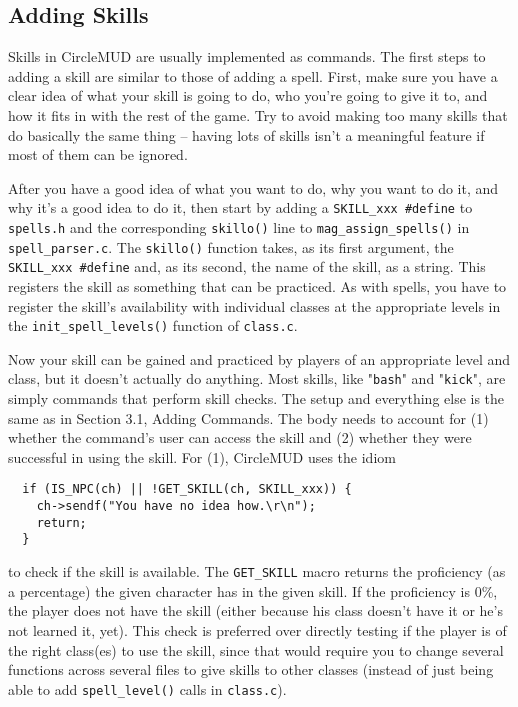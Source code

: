 \documentclass[11pt]{article}
\begin{document}
\subsection{Adding Skills}
Skills in CircleMUD are usually implemented as commands.  The first steps to adding a skill are similar to those of adding a spell.  First, make sure you have a clear idea of what your skill is going to do, who you're going to give it to, and how it fits in with the rest of the game.  Try to avoid making too many skills that do basically the same thing -- having lots of skills isn't a meaningful feature if most of them can be ignored.
\par
After you have a good idea of what you want to do, why you want to do it, and why it's a good idea to do it, then start by adding a \texttt{SKILL\_xxx \#define} to \texttt{spells.h} and the corresponding \texttt{skillo()} line to \texttt{mag\_assign\_spells()} in \texttt{spell\_parser.c}.  The \texttt{skillo()} function takes, as its first argument, the \texttt{SKILL\_xxx \#define} and, as its second, the name of the skill, as a string.  This registers the skill as something that can be practiced.  As with spells, you have to register the skill's availability with individual classes at the appropriate levels in the \texttt{init\_spell\_levels()} function of \texttt{class.c}.
\par
Now your skill can be gained and practiced by players of an appropriate level and class, but it doesn't actually do anything. Most skills, like "\texttt{bash}" and "\texttt{kick}", are simply commands that perform skill checks.  The setup and everything else is the same as in Section 3.1, Adding Commands.  The body needs to account for (1) whether the command's user can access the skill and (2) whether they were successful in using the skill.  For (1), CircleMUD uses the idiom
\begin{verbatim}
  if (IS_NPC(ch) || !GET_SKILL(ch, SKILL_xxx)) {
    ch->sendf("You have no idea how.\r\n");
    return;
  }
\end{verbatim}
to check if the skill is available.  The \texttt{GET\_SKILL} macro returns the proficiency (as a percentage) the given character has in the given skill.  If the proficiency is 0\%, the player does not have the skill (either because his class doesn't have it or he's not learned it, yet).  This check is
preferred over directly testing if the player is of the right class(es) to use the skill, since that would require you to change several functions across several files to give skills to other classes (instead of just being able to add \texttt{spell\_level()} calls in \texttt{class.c}).
\end{document}
